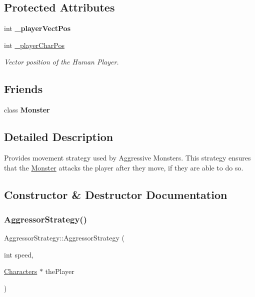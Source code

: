\subsection*{Protected Attributes}
\begin{DoxyCompactItemize}
\item 
\hypertarget{class_aggressor_strategy_adf6903d1ca861fe3183e660c893ae04c}{}\label{class_aggressor_strategy_adf6903d1ca861fe3183e660c893ae04c} 
int {\bfseries \+\_\+player\+Vect\+Pos}
\item 
\hypertarget{class_aggressor_strategy_a9a5504ef627051006c0f941adfe8b7c4}{}\label{class_aggressor_strategy_a9a5504ef627051006c0f941adfe8b7c4} 
int \hyperlink{class_aggressor_strategy_a9a5504ef627051006c0f941adfe8b7c4}{\+\_\+player\+Char\+Pos}
\begin{DoxyCompactList}\small\item\em Vector position of the Human Player. \end{DoxyCompactList}\end{DoxyCompactItemize}
\subsection*{Friends}
\begin{DoxyCompactItemize}
\item 
\hypertarget{class_aggressor_strategy_acd1214449703bd4d1b095efc07489f45}{}\label{class_aggressor_strategy_acd1214449703bd4d1b095efc07489f45} 
class {\bfseries Monster}
\end{DoxyCompactItemize}


\subsection{Detailed Description}
Provides movement strategy used by Aggressive Monsters. This strategy ensures that the \hyperlink{class_monster}{Monster} attacks the player after they move, if they are able to do so. 

\subsection{Constructor \& Destructor Documentation}
\hypertarget{class_aggressor_strategy_ab6f672135588d2ef8d9115535712deec}{}\label{class_aggressor_strategy_ab6f672135588d2ef8d9115535712deec} 
\subsubsection{\texorpdfstring{Aggressor\+Strategy()}{AggressorStrategy()}\hspace{0.1cm}{\footnotesize\ttfamily [1/2]}}
{\footnotesize\ttfamily Aggressor\+Strategy\+::\+Aggressor\+Strategy (\begin{DoxyParamCaption}\item[{int}]{speed,  }\item[{\hyperlink{class_characters}{Characters} $\ast$}]{the\+Player }\end{DoxyParamCaption})}

